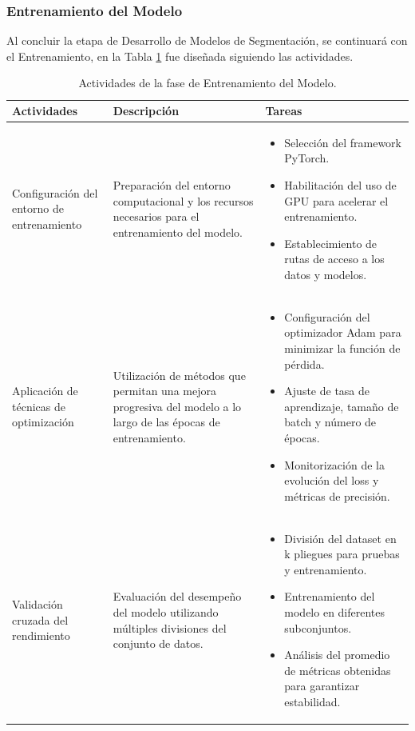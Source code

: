 \subsubsection{Entrenamiento del Modelo}
Al concluir la etapa de Desarrollo de Modelos de Segmentación, se continuará con el Entrenamiento, en la Tabla \ref{tabla:entrenamiento_modelo} fue diseñada siguiendo las actividades.

\vspace{2ex}
\begingroup
\renewcommand\arraystretch{1.2}
\begin{longtable}{>{\raggedright\arraybackslash}p{4cm} >{\raggedright\arraybackslash}p{6cm} >{\raggedright\arraybackslash}p{6cm}}
\caption{Actividades de la fase de Entrenamiento del Modelo.}
\label{tabla:entrenamiento_modelo}\\
\toprule
\centering\textbf{Actividades} & \centering\textbf{Descripción} & \centering\textbf{Tareas} \tabularnewline
\midrule
\endfirsthead

\bottomrule
\endfoot

Configuración del entorno de entrenamiento &
Preparación del entorno computacional y los recursos necesarios para el entrenamiento del modelo. &
\begin{itemize}
    \item Selección del framework PyTorch.
    \item Habilitación del uso de GPU para acelerar el entrenamiento.
    \item Establecimiento de rutas de acceso a los datos y modelos.
\end{itemize} \\[2ex]

Aplicación de técnicas de optimización &
Utilización de métodos que permitan una mejora progresiva del modelo a lo largo de las épocas de entrenamiento. &
\begin{itemize}
    \item Configuración del optimizador Adam para minimizar la función de pérdida.
    \item Ajuste de tasa de aprendizaje, tamaño de batch y número de épocas.
    \item Monitorización de la evolución del loss y métricas de precisión.
\end{itemize} \\[2ex]

Validación cruzada del rendimiento &
Evaluación del desempeño del modelo utilizando múltiples divisiones del conjunto de datos. &
\begin{itemize}
    \item División del dataset en k pliegues para pruebas y entrenamiento.
    \item Entrenamiento del modelo en diferentes subconjuntos.
    \item Análisis del promedio de métricas obtenidas para garantizar estabilidad.
\end{itemize} \\

\end{longtable}
\endgroup



